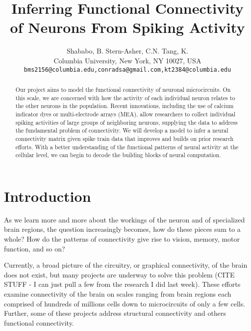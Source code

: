 \documentclass{article}
\title{Inferring Functional Connectivity of Neurons From Spiking Activity}
\author{
Shababo, B. \hspace{1cm} Stern-Asher, C.N. \hspace{1cm} Tang, K.\\
Columbia University, New York, NY 10027, USA \\
\texttt{bms2156@columbia.edu,conradsa@gmail.com,kt2384@columbia.edu}
}
\begin{document}
\maketitle

\begin{abstract}
Our project aims to model the functional connectivity of neuronal
microcircuits. On this scale, we are concerned with how the activity
of each individual neuron relates to the other neurons in the
population. Recent innovations, including the use of calcium indicator
dyes or multi-electrode arrays (MEA), allow researchers to collect
individual spiking activities of large groups of neighboring neurons,
supplying the data to address the fundamental problem of connectivity.
We will develop a model to infer a neural connectivity matrix given
spike train data that improves and builds on prior research efforts.
With a better understanding of the functional patterns of neural
activity at the cellular level, we can begin to decode the building
blocks of neural computation.
\end{abstract}

\section{Introduction}
\label{sec:introduction}

As we learn more and more about the workings of the neuron and of
specialized brain regions, the question increasingly becomes, how
do these pieces sum to a whole? How do the patterns of connectivity
give rise to vision, memory, motor function, and so on?

Currently, a broad picture of the circuitry, or graphical connectivity,
of the brain does not exist, but many projects are underway to solve
this problem (CITE STUFF - I can just pull a few from the research
I did last week). These efforts examine connectivity of the brain
on scales ranging from brain regions each comprised of hundreds of
millions cells down to microcircuits of only a few cells. Further,
some of these projects address structural connectivity and others
functional connectivity.
\end{document}
